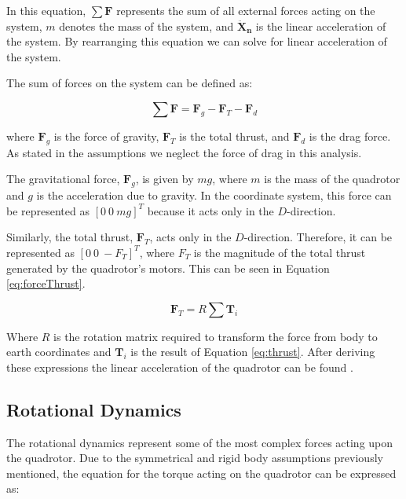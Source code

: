 \documentclass{UoNMCHA}
\numberwithin{equation}{section}
\begin{document}
In this equation, \(\sum \mathbf{F}\) represents the sum of all external forces acting on the system, \(m\) denotes the mass of the system, and \(\mathbf{\ddot{X}_n}\) is the linear acceleration of the system. By rearranging this equation we can solve for linear acceleration of the system.

The sum of forces on the system can be defined as:

\begin{equation}
\sum \mathbf{F} = \mathbf{F}_g - \mathbf{F}_T - \mathbf{F}_d
\label{eq:sum_of_forces}
\end{equation}

where \(\mathbf{F}_g\) is the force of gravity, \(\mathbf{F}_T\) is the total thrust, and \(\mathbf{F}_d\) is the drag force. As stated in the assumptions we neglect the force of drag in this analysis.

The gravitational force, \(\mathbf{F}_g\), is given by \(mg\), where \(m\) is the mass of the quadrotor and \(g\) is the acceleration due to gravity. In the coordinate system, this force can be represented as \([0 \ 0 \ mg]^T\) because it acts only in the \(D\)-direction.

Similarly, the total thrust, \(\mathbf{F}_T\), acts only in the \(D\)-direction. Therefore, it can be represented as \([0 \ 0 \ -F_T]^T\), where \(F_T\) is the magnitude of the total thrust generated by the quadrotor's motors. This can be seen in Equation \ref{eq:forceThrust}.


\begin{equation}
    \mathbf{F}_T = R \sum \mathbf{T}_i
    \label{eq:forceThrust}
    \end{equation}

Where \( R \) is the rotation matrix required to transform the force from body to earth coordinates and \( \mathbf{T}_i \) is the result of Equation \ref{eq:thrust}.
After deriving these expressions the linear acceleration of the quadrotor can be found \cite{website:Quadrotorsystemmodeling}.

\subsection{Rotational Dynamics}

The rotational dynamics represent some of the most complex forces acting upon the quadrotor. Due to the symmetrical and rigid body assumptions previously mentioned, the equation for the torque acting on the quadrotor can be expressed as:
\end{document}
